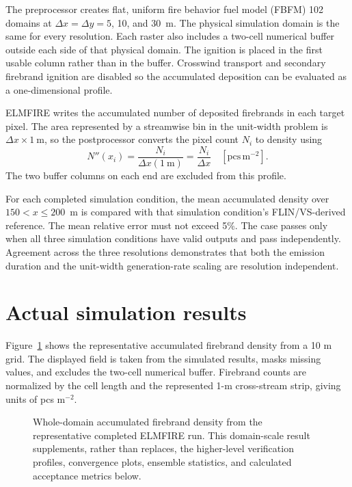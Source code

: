 The preprocessor creates flat, uniform fire behavior fuel model (FBFM) 102 domains at
$\Delta x=\Delta y=5$, 10, and 30~m. The physical simulation domain is the
same for every resolution. Each raster also includes a two-cell numerical
buffer outside each side of that physical domain. The ignition is placed in
the first usable column rather than in the buffer. Crosswind transport and
secondary firebrand ignition are disabled so the accumulated deposition can
be evaluated as a one-dimensional profile.

ELMFIRE writes the accumulated number of deposited firebrands in each target
pixel. The area represented by a streamwise bin in the unit-width problem is
$\Delta x\times1~\mathrm{m}$, so the postprocessor converts the pixel count
$N_i$ to density using
\[
  N''(x_i)=\frac{N_i}{\Delta x(1~\mathrm{m})}
  =\frac{N_i}{\Delta x}
  \quad [\mathrm{pcs\,m^{-2}}].
\]
The two buffer columns on each end are excluded from this profile.

For each completed simulation condition, the mean accumulated density over
$150<x\leq200$~m is compared with that simulation condition's FLIN/VS-derived reference.
The mean relative error must not exceed 5\%. The case passes only when all
three simulation conditions have valid outputs and pass independently. Agreement across the
three resolutions demonstrates that both the emission duration and the
unit-width generation-rate scaling are resolution independent.

\section{Actual simulation results}

Figure~\ref{fig:domain-result} shows the representative accumulated firebrand density from a 10 m grid.
The displayed field is taken from the simulated results, masks missing values, and excludes
the two-cell numerical buffer.  Firebrand counts are normalized by the cell length and the represented 1-m cross-stream strip, giving units of pcs m$^{-2}$.

\begin{figure}[H]
\centering
{}
\caption{Whole-domain accumulated firebrand density from the representative completed ELMFIRE run.  This
domain-scale result supplements, rather than replaces, the higher-level verification
profiles, convergence plots, ensemble statistics, and calculated acceptance metrics below.}
\label{fig:domain-result}
\end{figure}

